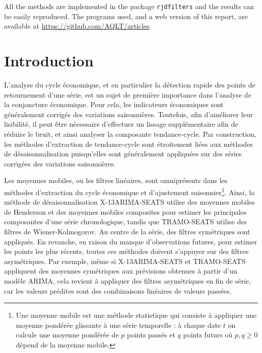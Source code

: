 \documentclass[
  12pt,
  a4paper,french]{article}
\newcommand\1{\mathds{1}}
\begin{document}
All the methods are implemented in the  package
\texttt{rjdfilters} and the results can be easily reproduced. The
programs used, and a web version of this report, are available at
\url{https://github.com/AQLT/articles}.

{
\hypersetup{linkcolor=}
\setcounter{tocdepth}{3}
\tableofcontents
}
\hypertarget{introduction}{%
\section*{Introduction}\label{introduction}}

L'analyse du cycle économique, et en particulier la détection rapide des points de retournement d'une série, est un sujet de première importance dans l'analyse de la conjoncture économique.
Pour cela, les indicateurs économiques sont généralement corrigés des variations saisonnières.
Toutefois, afin d'améliorer leur lisibilité, il peut être nécessaire d'effectuer un lissage supplémentaire afin de réduire le bruit, et ainsi analyser la composante tendance-cycle.
Par construction, les méthodes d'extraction de tendance-cycle sont étroitement liées aux méthodes de désaisonnalisation puisqu'elles sont généralement appliquées sur des séries corrigées des variations saisonnières.

Les moyennes mobiles, ou les filtres linéaires, sont omniprésents dans les méthodes d'extraction du cycle économique et d'ajustement saisonnier\footnote{
  Une moyenne mobile est une méthode statistique qui consiste à appliquer une moyenne pondérée glissante à une série temporelle : à chaque date \(t\) on calcule une moyenne pondérée de \(p\) points passés et \(q\) points futurs où \(p,q\geq0\) dépend de la moyenne mobile.}.
Ainsi, la méthode de désaisonnalisation X-13ARIMA-SEATS utilise des moyennes mobiles de Henderson et des moyennes mobiles composites pour estimer les principales composantes d'une série chronologique, tandis que TRAMO-SEATS utilise des filtres de Wiener-Kolmogorov.
Au centre de la série, des filtres symétriques sont appliqués.
En revanche, en raison du manque d'observations futures, pour estimer les points les plus récents, toutes ces méthodes doivent s'appuyer sur des filtres asymétriques.
Par exemple, même si X-13ARIMA-SEATS et TRAMO-SEATS appliquent des moyennes symétriques aux prévisions obtenues à partir d'un modèle ARIMA, cela revient à appliquer des filtres asymétriques en fin de série, car les valeurs prédites sont des combinaisons linéaires de valeurs passées.
\end{document}
